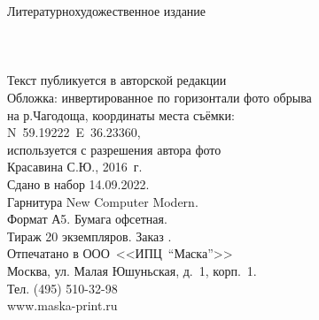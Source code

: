 {
\newpage
\thispagestyle{empty}
\begin{center}
{\small Литературно\sdash художественное издание}\\
\vspace{1.6cm}
{\Large \MyVarAuthorName}\\
\vspace{1.6cm}
{\Large\textbf\MyVarBookName}\\
\vspace{0.4cm}
{\Large\textbf\MyVarBookNamesec}\\
\vspace{1.0cm}
{\small%
Текст публикуется в авторской редакции\\
\vspace{1.0cm}
Обложка: инвертированное по горизонтали фото обрыва\\
на р.Чагодоща, координаты места съёмки:\\N~59.19222\degree~E~36.23360\degree,\\используется с разрешения автора фото\mdash \\ Красавина С.Ю., 2016~г.\\
\vspace{1.5cm}
Сдано в набор 14.09.2022.\\
Гарнитура New Computer Modern.\\
Формат А5. Бумага офсетная.\\
Тираж 20 экземпляров. Заказ .\\
\vspace{1.0cm}
Отпечатано в ООО~<<ИПЦ~"`Маска"'>>\\
Москва, ул. Малая Юшуньская, д.~1, корп.~1.\\
Тел. (495) 510-32-98\\
www.maska-print.ru
}
\end{center}
}